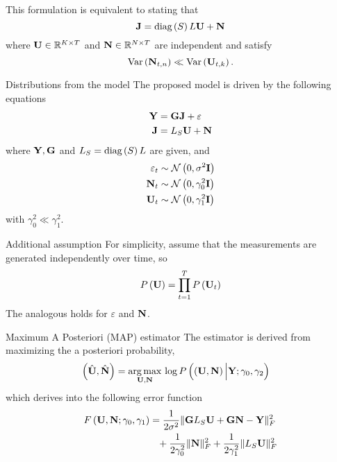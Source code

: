 This formulation is equivalent to stating that
\begin{equation}
    \mathbf{J} = \text{diag}\left( S \right) L \mathbf{U} + \mathbf{N}
\end{equation}
where $\mathbf{U}\in \mathbb{R}^{K\times T}$ and $\mathbf{N}\in \mathbb{R}^{N\times T}$ are independent and satisfy
\begin{equation}
    \text{Var}\left( \mathbf{N}_{t,n} \right) \ll \text{Var}\left( \mathbf{U}_{t,k} \right).
\end{equation}
 

 {Distributions from the model}
The proposed model is driven by the following equations
\begin{align}
    \mathbf{Y} &= \mathbf{G} \mathbf{J} + \varepsilon \\
    \mathbf{J} &=  L_S \mathbf{U} + \mathbf{N}
\end{align}
where $\mathbf{Y}, \mathbf{G}$ and $L_S = \text{diag}\left( S \right) L$ are given, and
\begin{align}
    \varepsilon_t &\sim  \mathcal{N}\left( 0, \sigma^2 \mathbf{I}  \right) \\
    \mathbf{N}_t &\sim  
    \mathcal{N}\left( 0, \gamma_0^2 \mathbf{I}  \right) \\
    \mathbf{U}_t &\sim  
    \mathcal{N}\left( 0, \gamma_1^2 \mathbf{I}  \right) 
\end{align}
with $\gamma_0^2 \ll \gamma_1^2$.
 


 {Additional assumption}
For simplicity, assume that
the measurements are generated independently over time, so
\begin{equation}
    P\left(  \mathbf{U}  \right) = \prod_{t=1}^T P\left(  \mathbf{U}_t  \right)
\end{equation}
The analogous holds for $\varepsilon$ and $\mathbf{N}$.
 

 {Maximum A Posteriori (MAP) estimator}
The estimator is derived from maximizing the a posteriori probability,
\begin{align}
    \left(  \hat{\mathbf{U}}, \hat{\mathbf{N}}  \right) &=
    \operatorname*{arg\,max}_{\mathbf{U}, \mathbf{N} }\,
    \log P\left( \left(  {\mathbf{U}}, {\mathbf{N}}  \right) \Big| {\mathbf{Y}; \gamma_0, \gamma_2}  \right)
\end{align}
which derives into the following error function
\begin{align}
    F\left(  {\mathbf{U}}, {\mathbf{N}};  \gamma_0, \gamma_1 \right) &=
    \frac{1}{2\sigma^2}
    \lVert \mathbf{G} L_S \mathbf{U} + \mathbf{G} \mathbf{N} - \mathbf{Y} \rVert_F^2
    \nonumber \\
    &\phantom{=}
    +
    \frac{1}{2\gamma_0^2} \lVert \mathbf{N} \rVert_F^2
    +
    \frac{1}{2\gamma_1^2} \lVert L_S \mathbf{U} \rVert_F^2
\end{align}
 


